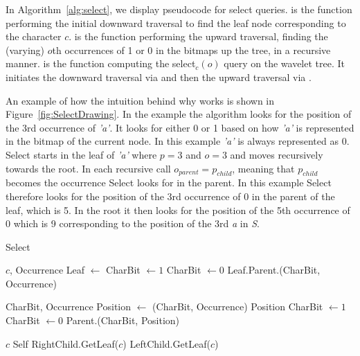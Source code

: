 In Algorithm~\ref{alg:select}, we display pseudocode for select queries.
 is the function performing the initial downward traversal to find the leaf node corresponding to the character $c$.
 is the function performing the upward traversal, finding the (varying) $o$th occurrences of 1 or 0 in the bitmaps up the tree, in a recursive manner.
 is the function computing the select$_{c}(o)$ query on the wavelet tree.
It initiates the downward traversal via  and then the upward traversal via .

An example of how the intuition behind why  works is shown in Figure~\ref{fig:SelectDrawing}.
In the example the algorithm looks for the position of the 3rd occurrence of \textit{'a'}.
It looks for either 0 or 1 based on how \textit{'a'} is represented in the bitmap of the current node. In this example \textit{'a'} is always represented as 0.
Select starts in the leaf of \textit{'a'} where $p = 3$ and $o = 3$ and moves recursively towards the root. In each recursive call $o_{parent} = p_{child}$, meaning that $p_{child}$ becomes the occurrence Select looks for in the parent. In this example Select therefore looks for the position of the 3rd occurrence of 0 in the parent of the leaf, which is 5. In the root it then looks for the position of the 5th occurrence of 0 which is 9 corresponding to the position of the 3rd \textit{a} in \textit{S}.

\begin{algorithm}
\caption{Select}
\label{alg:select}
\begin{algorithmic} 
 {$c$, Occurrence}
\State Leaf $\gets$ 
	\State CharBit $\gets 1$
\Else
	\State CharBit $\gets 0$
\EndIf
\State \Return Leaf.Parent.(CharBit, Occurrence)
\EndFunction

\vspace{5mm}

 {CharBit, Occurrence}
\State Position $\gets$ (CharBit, Occurrence)
	\State \Return Position
\EndIf
{}
	\State CharBit $\gets 1$
\Else
	\State CharBit $\gets 0$
\EndIf
\State \Return Parent.(CharBit, Position)
\EndFunction

\vspace{5mm}

 {$c$}
	\State \Return Self
\EndIf
{}
	\State \Return RightChild.GetLeaf($c$)
\Else
	\State \Return LeftChild.GetLeaf($c$)
\EndIf
\EndFunction
\end{algorithmic}
\end{algorithm}

